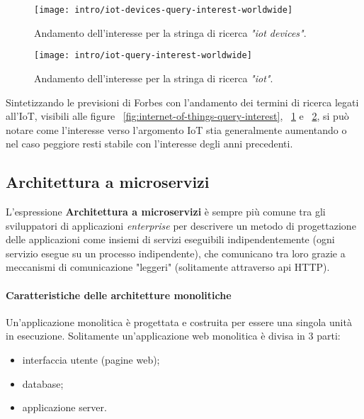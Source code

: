 \begin{figure}[!ht]
    \centering
    \texttt{[image: intro/iot-devices-query-interest-worldwide]}
    \caption{Andamento dell'interesse per la stringa di ricerca \textit{"iot devices"}. \\ \cite{site:iot-devices-trend}}
    \label{fig:iot-devices-query-interest}
\end{figure}

\begin{figure}[!ht]
    \centering
    \texttt{[image: intro/iot-query-interest-worldwide]}
    \caption{Andamento dell'interesse per la stringa di ricerca \textit{"iot"}. \\ \cite{site:iot-short-trend}}
    \label{fig:iot-query-interest}
\end{figure}

Sintetizzando le previsioni di Forbes con l'andamento dei termini di ricerca legati all'IoT, visibili alle figure ~\ref{fig:internet-of-things-query-interest}, ~\ref{fig:iot-devices-query-interest} e ~\ref{fig:iot-query-interest}, si può notare come l'interesse verso l'argomento IoT stia generalmente aumentando o nel caso peggiore resti stabile con l'interesse degli anni precedenti.

\subsection{Architettura a microservizi}

L'espressione \textbf{Architettura a microservizi} è sempre più comune tra gli sviluppatori di applicazioni \textit{enterprise} per descrivere un metodo di progettazione delle applicazioni come insiemi di servizi eseguibili indipendentemente (ogni servizio esegue su un processo indipendente), che comunicano tra loro grazie a meccanismi di comunicazione "leggeri" (solitamente attraverso \gls{api} HTTP).

\paragraph{Caratteristiche delle architetture monolitiche}

Un'applicazione monolitica è progettata e costruita per essere una singola unità in esecuzione. Solitamente un'applicazione web monolitica è divisa in 3 parti:
\begin{itemize}
  \item interfaccia utente (pagine web);
  \item database;
  \item applicazione server.
\end{itemize}


